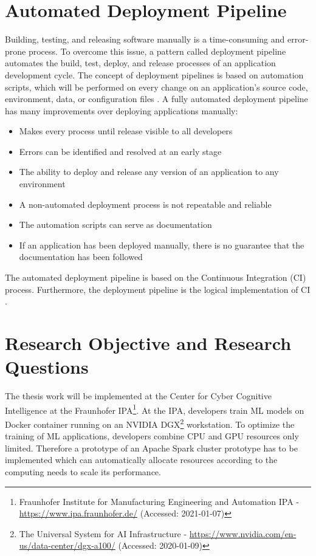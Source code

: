 \section{Automated Deployment Pipeline}
Building, testing, and releasing software manually is a time-consuming and error-prone process.
To overcome this issue, a pattern called deployment pipeline automates the build, test, deploy, and release processes of an application development cycle.
The concept of deployment pipelines is based on automation scripts, which will be performed on every change on an application's source code, environment, data, or configuration files \cite{Farley2010CI}.
A fully automated deployment pipeline has many improvements over deploying applications manually:
\begin{itemize}
\item Makes every process until release visible to all developers \cite{Farley2010CI}
\item Errors can be identified and resolved at an early stage \cite{Farley2010CI}
\item The ability to deploy and release any version of an application to any environment \cite{Farley2010CI}
\item A non-automated deployment process is not repeatable and reliable \cite{Farley2010CI}
\item The automation scripts can serve as documentation \cite{Farley2010CI}
\item If an application has been deployed manually, there is no guarantee that the documentation has been followed \cite{Farley2010CI}
\end{itemize}
The automated deployment pipeline is based on the Continuous Integration (CI) process. Furthermore, the deployment pipeline is the logical implementation of CI \cite{Farley2010CI}.


\section{Research Objective and Research Questions}
The thesis work will be implemented at the Center for Cyber Cognitive Intelligence at the Fraunhofer IPA\footnote{Fraunhofer Institute for Manufacturing Engineering and Automation IPA - \url{https://www.ipa.fraunhofer.de/} (Accessed: 2021-01-07)}.
At the IPA, developers train ML models on Docker container running on an NVIDIA DGX\footnote{The Universal System for AI Infrastructure - \url{https://www.nvidia.com/en-us/data-center/dgx-a100/} (Accessed: 2020-01-09)} workstation.
To optimize the training of ML applications, developers combine CPU and GPU resources only limited.
Therefore a prototype of an Apache Spark cluster prototype has to be implemented which can automatically allocate resources according to the computing needs to scale its performance.


